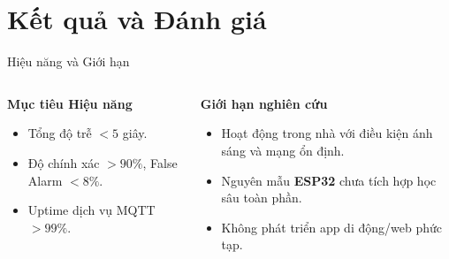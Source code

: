 
\section{Kết quả và Đánh giá}
\begin{frame}{Hiệu năng và Giới hạn}
    \begin{columns}[T]
        \begin{column}{0.48\textwidth}
            \textbf{Mục tiêu Hiệu năng}
            \begin{itemize}
                \item Tổng độ trễ $<5$ giây.
                \item Độ chính xác $>90\%$, False Alarm $<8\%$.
                \item Uptime dịch vụ MQTT $>99\%$.
            \end{itemize}
        \end{column}
        \begin{column}{0.48\textwidth}
            \textbf{Giới hạn nghiên cứu}
            \begin{itemize}
                \item Hoạt động trong nhà với điều kiện ánh sáng và mạng ổn định.
                \item Nguyên mẫu \textbf{ESP32} chưa tích hợp học sâu toàn phần.
                \item Không phát triển app di động/web phức tạp.
            \end{itemize}
        \end{column}
    \end{columns}
\end{frame}
